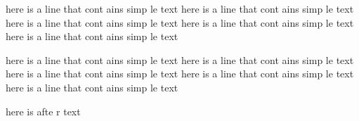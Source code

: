 here
is a
line
that
cont
ains
simp
le
text
here
is a
line
that
cont
ains
simp
le
text
here
is a
line
that
cont
ains
simp
le
text
here
is a
line
that
cont
ains
simp
le
text
here
is a
line
that
cont
ains
simp
le
text

here
is a
line
that
cont
ains
simp
le
text
here
is a
line
that
cont
ains
simp
le
text
here
is a
line
that
cont
ains
simp
le
text
here
is a
line
that
cont
ains
simp
le
text
here
is a
line
that
cont
ains
simp
le
text

here
is
afte
r
text
